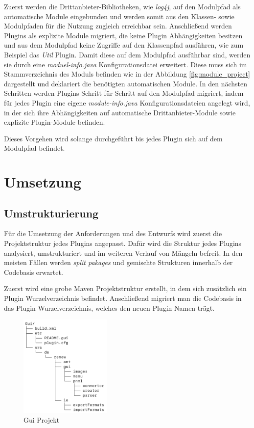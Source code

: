 Zuerst werden die Drittanbieter-Bibliotheken, wie \textit{log4j}, auf den Modulpfad als automatische Module eingebunden und werden somit aus den Klassen- sowie Modulpfaden für die Nutzung zugleich erreichbar sein. Anschließend werden Plugins als explizite Module migriert, die keine Plugin Abhängigkeiten besitzen und aus dem Modulpfad keine Zugriffe auf den Klassenpfad ausführen, wie zum Beispiel das \textit{Util} Plugin. 
Damit diese auf dem Modulpfad ausführbar sind, werden sie durch eine \textit{moduel-info.java} Konfigurationsdatei erweitert. Diese muss sich im Stammverzeichnis des Moduls befinden wie in der Abbildung \ref{fig:module_project} dargestellt und deklariert die benötigten automatischen Module. In den nächsten Schritten werden Plugins Schritt für Schritt auf den Modulpfad migriert, indem für jedes Plugin eine eigene \textit{module-info.java} Konfigurationsdateien angelegt wird, in der sich ihre Abhängigkeiten auf automatische Drittanbieter-Module sowie explizite Plugin-Module befinden.


Dieses Vorgehen wird solange durchgeführt bis jedes Plugin sich auf dem Modulpfad befindet. 


\section{Umsetzung}


\subsection{Umstrukturierung}

	Für die Umsetzung der Anforderungen und des Entwurfs wird zuerst die Projektstruktur jedes Plugins angepasst. Dafür wird die Struktur jedes Plugins analysiert, umstrukturiert und im weiteren Verlauf von Mängeln befreit. In den meisten Fällen werden \textit{split pakages} und gemischte Strukturen innerhalb der Codebasis erwartet.
\bigbreak

	Zuerst wird eine grobe Maven Projektstruktur erstellt, in dem sich zusätzlich ein Plugin Wurzelverzeichnis befindet. Anschließend migriert man die Codebasis in das Plugin Wurzelverzeichnis, welches den neuen Plugin Namen trägt.

	\begin{figure}[h!]
	  \centering
	  \includegraphics[width=0.4\textwidth]{material/images/gui_struktur.png}
	  \caption{Gui Projekt}
	  \label{fig:gui}
	\end{figure}


